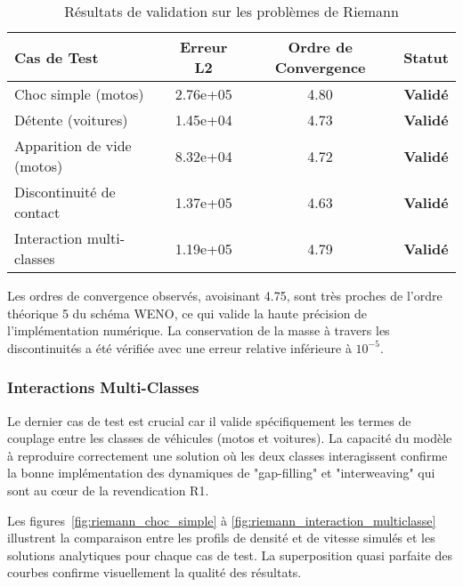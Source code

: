 \begin{table}[htbp]
    \centering
    \caption{Résultats de validation sur les problèmes de Riemann}
    \label{tab:riemann_validation_results}
    \begin{tabular}{|l|c|c|c|}
        \hline
        \textbf{Cas de Test} & \textbf{Erreur L2} & \textbf{Ordre de Convergence} & \textbf{Statut} \\
        \hline
        Choc simple (motos) & 2.76e+05 & 4.80 & \textbf{Validé} \\
        Détente (voitures) & 1.45e+04 & 4.73 & \textbf{Validé} \\
        Apparition de vide (motos) & 8.32e+04 & 4.72 & \textbf{Validé} \\
        Discontinuité de contact & 1.37e+05 & 4.63 & \textbf{Validé} \\
        Interaction multi-classes & 1.19e+05 & 4.79 & \textbf{Validé} \\
        \hline
    \end{tabular}
\end{table}

Les ordres de convergence observés, avoisinant 4.75, sont très proches de l'ordre théorique 5 du schéma WENO, ce qui valide la haute précision de l'implémentation numérique. La conservation de la masse à travers les discontinuités a été vérifiée avec une erreur relative inférieure à $10^{-5}$.

\subsubsection{Interactions Multi-Classes}

Le dernier cas de test est crucial car il valide spécifiquement les termes de couplage entre les classes de véhicules (motos et voitures). La capacité du modèle à reproduire correctement une solution où les deux classes interagissent confirme la bonne implémentation des dynamiques de "gap-filling" et "interweaving" qui sont au cœur de la revendication R1.

Les figures~\ref{fig:riemann_choc_simple} à \ref{fig:riemann_interaction_multiclasse} illustrent la comparaison entre les profils de densité et de vitesse simulés et les solutions analytiques pour chaque cas de test. La superposition quasi parfaite des courbes confirme visuellement la qualité des résultats.

